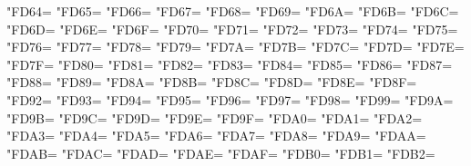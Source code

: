 \XeTeXcharclass"FD64=\KclassArabU
\XeTeXcharclass"FD65=\KclassArabU
\XeTeXcharclass"FD66=\KclassArabU
\XeTeXcharclass"FD67=\KclassArabU
\XeTeXcharclass"FD68=\KclassArabU
\XeTeXcharclass"FD69=\KclassArabU
\XeTeXcharclass"FD6A=\KclassArabU
\XeTeXcharclass"FD6B=\KclassArabU
\XeTeXcharclass"FD6C=\KclassArabU
\XeTeXcharclass"FD6D=\KclassArabU
\XeTeXcharclass"FD6E=\KclassArabU
\XeTeXcharclass"FD6F=\KclassArabU
\XeTeXcharclass"FD70=\KclassArabU
\XeTeXcharclass"FD71=\KclassArabU
\XeTeXcharclass"FD72=\KclassArabU
\XeTeXcharclass"FD73=\KclassArabU
\XeTeXcharclass"FD74=\KclassArabU
\XeTeXcharclass"FD75=\KclassArabU
\XeTeXcharclass"FD76=\KclassArabU
\XeTeXcharclass"FD77=\KclassArabU
\XeTeXcharclass"FD78=\KclassArabU
\XeTeXcharclass"FD79=\KclassArabU
\XeTeXcharclass"FD7A=\KclassArabU
\XeTeXcharclass"FD7B=\KclassArabU
\XeTeXcharclass"FD7C=\KclassArabU
\XeTeXcharclass"FD7D=\KclassArabU
\XeTeXcharclass"FD7E=\KclassArabU
\XeTeXcharclass"FD7F=\KclassArabU
\XeTeXcharclass"FD80=\KclassArabU
\XeTeXcharclass"FD81=\KclassArabU
\XeTeXcharclass"FD82=\KclassArabU
\XeTeXcharclass"FD83=\KclassArabU
\XeTeXcharclass"FD84=\KclassArabU
\XeTeXcharclass"FD85=\KclassArabU
\XeTeXcharclass"FD86=\KclassArabU
\XeTeXcharclass"FD87=\KclassArabU
\XeTeXcharclass"FD88=\KclassArabU
\XeTeXcharclass"FD89=\KclassArabU
\XeTeXcharclass"FD8A=\KclassArabU
\XeTeXcharclass"FD8B=\KclassArabU
\XeTeXcharclass"FD8C=\KclassArabU
\XeTeXcharclass"FD8D=\KclassArabU
\XeTeXcharclass"FD8E=\KclassArabU
\XeTeXcharclass"FD8F=\KclassArabU
\XeTeXcharclass"FD92=\KclassArabU
\XeTeXcharclass"FD93=\KclassArabU
\XeTeXcharclass"FD94=\KclassArabU
\XeTeXcharclass"FD95=\KclassArabU
\XeTeXcharclass"FD96=\KclassArabU
\XeTeXcharclass"FD97=\KclassArabU
\XeTeXcharclass"FD98=\KclassArabU
\XeTeXcharclass"FD99=\KclassArabU
\XeTeXcharclass"FD9A=\KclassArabU
\XeTeXcharclass"FD9B=\KclassArabU
\XeTeXcharclass"FD9C=\KclassArabU
\XeTeXcharclass"FD9D=\KclassArabU
\XeTeXcharclass"FD9E=\KclassArabU
\XeTeXcharclass"FD9F=\KclassArabU
\XeTeXcharclass"FDA0=\KclassArabU
\XeTeXcharclass"FDA1=\KclassArabU
\XeTeXcharclass"FDA2=\KclassArabU
\XeTeXcharclass"FDA3=\KclassArabU
\XeTeXcharclass"FDA4=\KclassArabU
\XeTeXcharclass"FDA5=\KclassArabU
\XeTeXcharclass"FDA6=\KclassArabU
\XeTeXcharclass"FDA7=\KclassArabU
\XeTeXcharclass"FDA8=\KclassArabU
\XeTeXcharclass"FDA9=\KclassArabU
\XeTeXcharclass"FDAA=\KclassArabU
\XeTeXcharclass"FDAB=\KclassArabU
\XeTeXcharclass"FDAC=\KclassArabU
\XeTeXcharclass"FDAD=\KclassArabU
\XeTeXcharclass"FDAE=\KclassArabU
\XeTeXcharclass"FDAF=\KclassArabU
\XeTeXcharclass"FDB0=\KclassArabU
\XeTeXcharclass"FDB1=\KclassArabU
\XeTeXcharclass"FDB2=\KclassArabU
